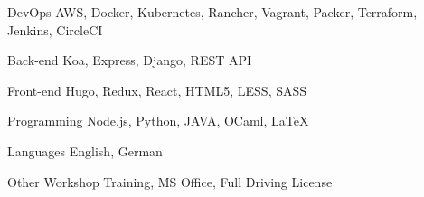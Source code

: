 

\begin{cvskills}

  \cvskill
    {DevOps} %
    {AWS, Docker, Kubernetes, Rancher, Vagrant, Packer, Terraform, Jenkins, CircleCI} %

  \cvskill
    {Back-end} %
    {Koa, Express, Django, REST API} %

  \cvskill
    {Front-end} %
    {Hugo, Redux, React, HTML5, LESS, SASS} %

  \cvskill
    {Programming} %
    {Node.js, Python, JAVA, OCaml, LaTeX} %

  \cvskill
    {Languages} %
    {English, German} %

  \cvskill
  {Other} %
  {Workshop Training, MS Office, Full Driving License} %

\end{cvskills}
